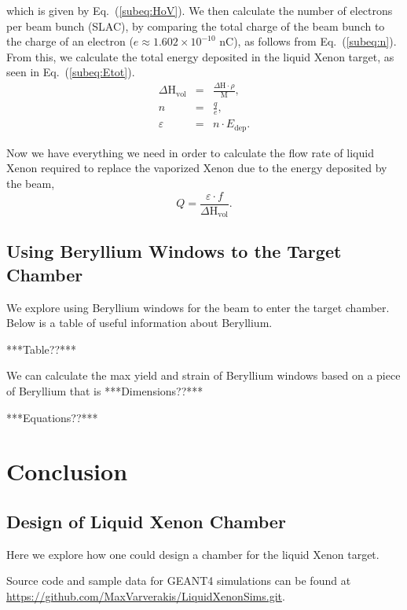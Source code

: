 \documentclass[%
reprint,
amsmath, amssymb,
aps,
floatfix,
]{revtex4-2}
\begin{document}
which is given by Eq.~(\ref{subeq:HoV}).
We then calculate the number of electrons per beam bunch (SLAC), by comparing the 
total charge of the beam bunch to the charge of an electron
($e \approx 1.602 \times 10^{-10}$ nC), as follows from Eq.~(\ref{subeq:n}).
From this, we calculate the total energy deposited in the liquid Xenon target, 
as seen in Eq.~(\ref{subeq:Etot}).
\begin{subequations}
    \begin{eqnarray}
        \Delta \textrm{H}_\textrm{vol} &=& \frac{\Delta \textrm{H}\cdot \rho}{\textrm{M}}, \label{subeq:HoV} \\
        n &=& \frac{q}{e}, \label{subeq:n} \\
        \varepsilon &=& n \cdot E_{\textrm{dep}} \label{subeq:Etot}.
    \end{eqnarray}
\end{subequations}
    
Now we have everything we need in order to calculate the flow rate of liquid Xenon
required to replace the vaporized Xenon due to the energy deposited by the beam,
\begin{equation}
    Q = \frac{\varepsilon \cdot f}{\Delta \textrm{H}_{\textrm{vol}}}.
\label{eq:Q}
\end{equation}

\subsection{Using Beryllium Windows to the Target Chamber}
We explore using Beryllium windows for the beam to enter the target chamber.
Below is a table of useful information about Beryllium.

***Table??***

We can calculate the max yield and strain of Beryllium windows based on a piece
of Beryllium that is ***Dimensions??***

***Equations??***


\section{Conclusion}
\subsection{Design of Liquid Xenon Chamber}
Here we explore how one could design a chamber for the liquid Xenon target.

Source code and sample data for GEANT4 simulations can be found at 
\url{https://github.com/MaxVarverakis/LiquidXenonSims.git}.
\end{document}
